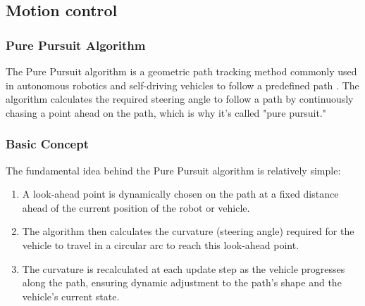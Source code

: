 \documentclass{article}
\begin{document}
	\subsection{Motion control}
	\subsubsection{Pure Pursuit Algorithm}
	The Pure Pursuit algorithm is a geometric path tracking method commonly used in autonomous robotics and self-driving vehicles to follow a predefined path \cite{corke2017}. The algorithm calculates the required steering angle to follow a path by continuously chasing a point ahead on the path, which is why it's called "pure pursuit."
	
	\subsubsection*{Basic Concept}
	The fundamental idea behind the Pure Pursuit algorithm is relatively simple:
	\begin{enumerate}
		\item A look-ahead point is dynamically chosen on the path at a fixed distance ahead of the current position of the robot or vehicle.
	
		\item The algorithm then calculates the curvature (steering angle) required for the vehicle to travel in a circular arc to reach this look-ahead point.
		
		\item The curvature is recalculated at each update step as the vehicle progresses along the path, ensuring dynamic adjustment to the path's shape and the vehicle's current state.
	\end{enumerate}
\end{document}
